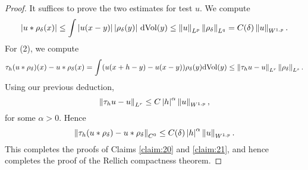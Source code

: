 \documentclass{amsart}
\begin{document}
\begin{proof}
  It suffices to prove the two estimates for test $u$. We compute
  \begin{equation*}
    \left|u\ast \rho_{\delta}(x)\right|\le \int \left|u(x-y)\right|\left|\rho_{\delta}(y)\right|\,\mathrm{d}\mathrm{Vol}(y)\le \left\lVert u\right\rVert_{L^{p}}\left\lVert\rho_{\delta}\right\rVert_{L^{q}}=C(\delta)\left\lVert u\right\rVert_{W^{1,p}}.
  \end{equation*}
  For (2), we compute
  \begin{equation*}
    \tau_{h}(u\ast \rho_{\delta})(x)-u\ast\rho_{\delta}(x)=\int (u(x+h-y)-u(x-y))\rho_{\delta}(y)\mathrm{d}\mathrm{Vol}(y)\le \left\lVert\tau_{h}u-u\right\rVert_{L^{r}}\left\lVert\rho_{\delta}\right\rVert_{L^{s}}.
  \end{equation*}
  Using our previous deduction,
  \begin{equation*}
    \left\lVert\tau_{h}u-u\right\rVert_{L^{r}}\le C\left|h\right|^{\alpha}\left\lVert u\right\rVert_{W^{1,p}},
  \end{equation*}
  for some $\alpha>0$. Hence
  \begin{equation*}
    \left\lVert\tau_{h}(u\ast \rho_{\delta})-u\ast\rho_{\delta}\right\rVert_{C^{0}}\le C(\delta) \left|h\right|^{\alpha}\left\lVert u\right\rVert_{W^{1,p}}.
  \end{equation*}
  This completes the proofs of Claims \ref{claim:20} and \ref{claim:21}, and hence completes the proof of the Rellich compactness theorem.
\end{proof}
\end{document}
